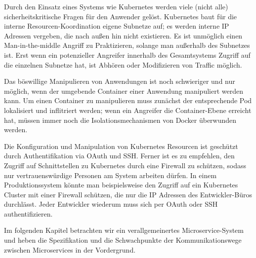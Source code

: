 Durch den Einsatz eines Systems wie Kubernetes werden viele (nicht alle) sicherheitskritische Fragen für den Anwender gelöst. Kubernetes baut für die interne Resourcen-Koordination eigene Subnetze auf; es werden interne IP Adressen vergeben, die nach außen hin nicht existieren. Es ist unmöglich einen Man-in-the-middle Angriff zu Praktizieren, solange man außerhalb des Subnetzes ist. Erst wenn ein potenzieller Angreifer innerhalb des Gesamtsystems Zugriff auf die einzelnen Subnetze hat, ist Abhören oder Modifizieren von Traffic möglich. 

Das böswillige Manipulieren von Anwendungen ist noch schwieriger und nur möglich, wenn der umgebende Container einer Anwendung manipuliert werden kann. Um einen Container zu manipulieren muss zunächst der entsprechende Pod lokalisiert und inflitriert werden; wenn ein Angreifer die Container-Ebene erreicht hat, müssen immer noch die Isolationsmechanismen von Docker überwunden werden. 

Die Konfiguration und Manipulation von Kubernetes Resourcen ist geschützt durch Authentifikation via OAuth und SSH. Ferner ist es zu empfehlen, den Zugriff auf Schnittstellen zu Kubernetes durch eine Firewall zu schützen, sodass nur vertrauenswürdige Personen am System arbeiten dürfen. In einem Produktionssystem könnte man beispielsweise den Zugriff auf ein Kubernetes Cluster mit einer Firewall schützen, die nur die IP Adressen des Entwickler-Büros durchlässt. Jeder Entwickler wiederum muss sich per OAuth oder SSH authentifizieren.

Im folgenden Kapitel betrachten wir ein verallgemeinertes Microservice-System und heben die Spezifikation und die Schwachpunkte der Kommunikationswege zwischen Microservices in der Vordergrund.  
